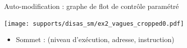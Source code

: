 \documentclass{beamer}
\begin{document}
\begin{frame}{Auto-modification : graphe de flot de contrôle paramétré}
\begin{minipage}{0.45\textwidth}
\begin{center}
 \texttt{[image: supports/disas\_sm/ex2\_vagues\_cropped0.pdf]}
\end{center}
\end{minipage}
\begin{minipage}{0.5\textwidth}

\begin{itemize}
 \item Sommet : (niveau d'exécution, adresse, instruction)
\end{itemize}
\end{minipage}
\end{frame}
\end{document}
